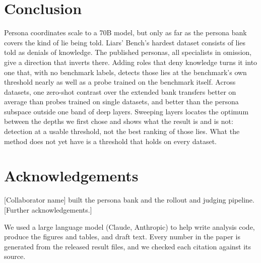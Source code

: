 \section{Conclusion}
\label{sec:conclusion}

Persona coordinates scale to a 70B model, but only as far as the persona bank covers the kind of
lie being told. Liars' Bench's hardest dataset consists of lies told as denials of knowledge. The
published personas, all specialists in omission, give a direction that inverts there. Adding roles
that deny knowledge turns it into one that, with no benchmark labels, detects those lies at the
benchmark's own threshold nearly as well as a probe trained on the benchmark itself. Across
datasets, one zero-shot contrast over the extended bank transfers better on average than probes
trained on single datasets, and better than the persona subspace outside one band of deep layers.
Sweeping  layers locates the optimum between the depths we first chose and shows what
the \hpkr{} result is and is not: detection at a usable threshold, not the best ranking of those
lies. What the method does not yet have is a threshold that holds on every dataset.

\section*{Acknowledgements}

[Collaborator name] built the persona bank and the rollout and judging pipeline. [Further
acknowledgements.]

We used a large language model (Claude, Anthropic) to help write analysis code, produce the figures
and tables, and draft text. Every number in the paper is generated from the released result files,
and we checked each citation against its source.
